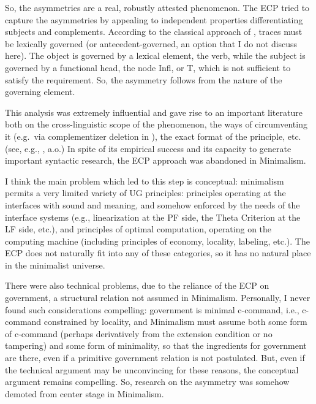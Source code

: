 \documentclass[output=paper]{langsci/langscibook}
\begin{document}
\ea%
    \label{ex:key:21.3}
    \z
\z
%
So, the asymmetries are a real, robustly attested phenomenon. The \gls{ECP}
tried to capture the asymmetries by appealing to independent properties
differentiating subjects and complements. According to the classical approach
of \citet{Chomsky1981}, traces must be lexically governed (or
antecedent-governed, an option that I do not discuss here). The object is
governed by a lexical element, the verb, while the subject is governed by a
functional head, the node Infl, or T, which is not sufficient to satisfy the
requirement. So, the asymmetry follows from the nature of the governing
element.

This analysis was extremely influential and gave rise to an important
literature both on the cross-linguistic scope of the phenomenon, the ways of
circumventing it (e.g.\ via complementizer deletion in ), the exact
format of the principle, etc. (see, e.g.,
\citealt{Pesetsky1982,Kayne1984,Rizzi:1982,Rizzi1990}, a.o.) In spite of its
empirical success and its capacity to generate important syntactic research,
the \gls{ECP} approach was abandoned in Minimalism.

I think the main problem which led to this step is conceptual: minimalism
permits a very limited variety of \gls{UG} principles: principles operating at the
interfaces with sound and meaning, and somehow enforced by the needs of the
interface systems (e.g., linearization at the \gls{PF} side, the Theta Criterion at
the LF side, etc.), and principles of optimal computation, operating on the
computing machine (including principles of economy, locality,
labeling, etc.).
The \gls{ECP} does not naturally fit into any of these categories, so it has no
natural place in the minimalist universe.

There were also technical problems, due to the reliance of the \gls{ECP} on
government, a structural relation not assumed in Minimalism. Personally, I
never found such considerations compelling: government is minimal c-command,
i.e., c-command constrained by locality, and Minimalism must assume both some
form of c-command (perhaps derivatively from the extension condition or no
tampering) and some form of minimality, so that the ingredients for government
are there, even if a primitive government relation is not postulated. But, even
if the technical argument may be unconvincing for these reasons, the conceptual
argument remains compelling. So, research on the asymmetry was somehow demoted
from center stage in Minimalism.
\end{document}
